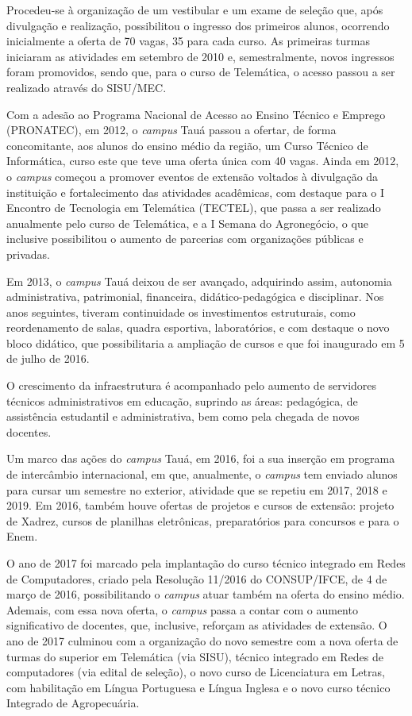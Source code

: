 \documentclass[
	12pt,				%
	openright,			%
	twoside,			%
	a4paper,			%
	chapter=TITLE,		%
	english,			%
	french,				%
	spanish,			%
	brazil,				%
	]{abntex2}
\begin{document}
Procedeu-se à organização de um vestibular e um exame de seleção que, após divulgação e realização, possibilitou o ingresso dos primeiros alunos, ocorrendo inicialmente a oferta de 70 vagas, 35 para cada curso. As primeiras turmas iniciaram as atividades em setembro de 2010 e, semestralmente, novos ingressos foram promovidos, sendo que, para o curso de Telemática, o acesso passou a ser realizado através do SISU/MEC.

Com a adesão ao Programa Nacional de Acesso ao Ensino Técnico e Emprego (PRONATEC), em 2012, o \textit{campus} Tauá passou a ofertar, de forma concomitante, aos alunos do ensino médio da região, um Curso Técnico de Informática, curso este que teve uma oferta única com 40 vagas. Ainda em 2012, o \textit{campus} começou a promover eventos de extensão voltados à divulgação da instituição e fortalecimento das atividades acadêmicas, com destaque para o I Encontro de Tecnologia em Telemática (TECTEL), que passa a ser realizado anualmente pelo curso de Telemática, e a I Semana do Agronegócio, o que inclusive possibilitou o aumento de parcerias com organizações públicas e privadas.

Em 2013, o \textit{campus} Tauá deixou de ser avançado, adquirindo assim, autonomia administrativa, patrimonial, financeira, didático-pedagógica e disciplinar. Nos anos seguintes, tiveram continuidade os investimentos estruturais, como reordenamento de salas, quadra esportiva, laboratórios, e com destaque o novo bloco didático, que possibilitaria a ampliação de cursos e que foi inaugurado em 5 de julho de 2016.

O crescimento da infraestrutura é acompanhado pelo aumento de servidores técnicos administrativos em educação, suprindo as áreas: pedagógica, de assistência estudantil e administrativa, bem como pela chegada de novos docentes.

Um marco das ações do \textit{campus} Tauá, em 2016, foi a sua inserção em programa de intercâmbio internacional, em que, anualmente, o  \textit{campus} tem enviado alunos para cursar um semestre no exterior, atividade que se repetiu em 2017, 2018 e 2019. Em 2016, também houve ofertas de projetos e cursos de extensão: projeto de Xadrez, cursos de planilhas eletrônicas, preparatórios para concursos e para o Enem.

O ano de 2017 foi marcado pela implantação do curso técnico integrado em Redes de Computadores, criado pela Resolução 11/2016 do CONSUP/IFCE, de 4 de março de 2016, possibilitando o \textit{campus} atuar também na oferta do ensino médio. Ademais, com essa nova oferta, o \textit{campus} passa a contar com o aumento significativo de docentes, que, inclusive, reforçam as atividades de extensão. O ano de 2017 culminou com a organização do novo semestre com a nova oferta de turmas do superior em Telemática (via SISU), técnico integrado em Redes de computadores (via edital de seleção), o novo curso de Licenciatura em Letras, com habilitação em Língua Portuguesa e Língua Inglesa e o novo curso técnico Integrado de Agropecuária.
\end{document}

